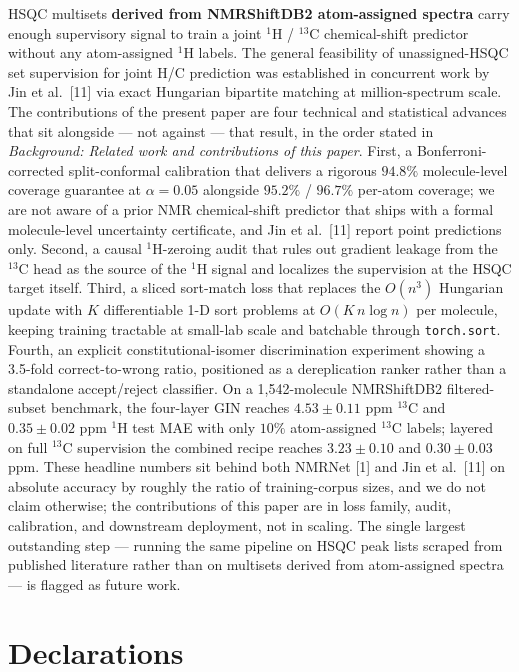 \documentclass[
  11pt,
  a4paper,
]{article}
\begin{document}
HSQC multisets \textbf{derived from NMRShiftDB2 atom-assigned spectra}
carry enough supervisory signal to train a joint \(^{1}\)H / \(^{13}\)C
chemical-shift predictor without any atom-assigned \(^{1}\)H labels.
The general feasibility of unassigned-HSQC set supervision for
joint H/C prediction was established in concurrent work by Jin et
al.~{[}11{]} via exact Hungarian bipartite matching at million-spectrum
scale. The contributions of the present paper are four technical
and statistical advances that sit alongside --- not against --- that
result, in the order stated in \emph{Background: Related work and
contributions of this paper}. First, a Bonferroni-corrected
split-conformal calibration that delivers a rigorous \(94.8\%\)
molecule-level coverage guarantee at \(\alpha = 0.05\) alongside
\(95.2\%\) / \(96.7\%\) per-atom coverage; we are not aware of a prior
NMR chemical-shift predictor that ships with a formal
molecule-level uncertainty certificate, and Jin et al.~{[}11{]} report
point predictions only. Second, a causal \(^{1}\)H-zeroing audit
that rules out gradient leakage from the \(^{13}\)C head as the
source of the \(^{1}\)H signal and localizes the supervision at the
HSQC target itself. Third, a sliced sort-match loss that replaces
the \(O(n^{3})\) Hungarian update with \(K\) differentiable 1-D sort
problems at \(O(K\,n\log n)\) per molecule, keeping training
tractable at small-lab scale and batchable through \texttt{torch.sort}.
Fourth, an explicit constitutional-isomer discrimination
experiment showing a 3.5-fold correct-to-wrong ratio, positioned
as a dereplication ranker rather than a standalone accept/reject
classifier. On a 1,542-molecule NMRShiftDB2
filtered-subset benchmark, the four-layer GIN reaches
\(4.53 \pm 0.11\) ppm \(^{13}\)C and \(0.35 \pm 0.02\) ppm \(^{1}\)H test
MAE with only \(10\%\) atom-assigned \(^{13}\)C labels; layered on full
\(^{13}\)C supervision the combined recipe reaches \(3.23 \pm 0.10\)
and \(0.30 \pm 0.03\) ppm. These headline numbers sit behind both
NMRNet {[}1{]} and Jin et al.~{[}11{]} on absolute accuracy by roughly the
ratio of training-corpus sizes, and we do not claim otherwise; the
contributions of this paper are in loss family, audit, calibration,
and downstream deployment, not in scaling. The single largest
outstanding step --- running the same pipeline on HSQC peak lists
scraped from published literature rather than on multisets derived
from atom-assigned spectra --- is flagged as future work.

\section{Declarations}\label{declarations}
\end{document}
